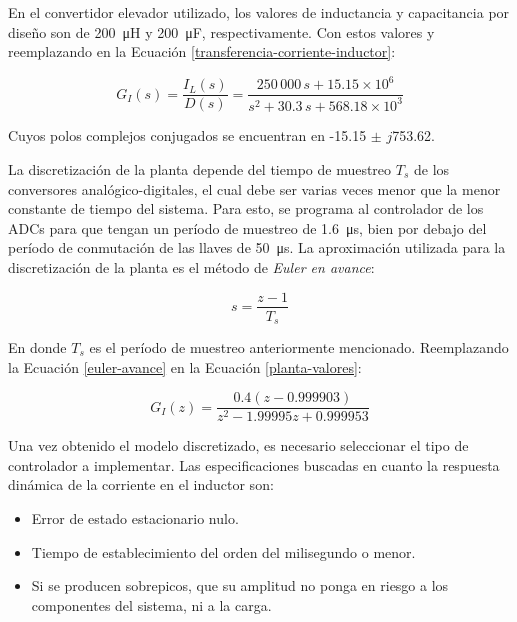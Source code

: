 En el convertidor elevador utilizado, los valores de inductancia y capacitancia por diseño son de \SI{200}{\micro\henry} y \SI{200}{\micro\farad}, respectivamente. Con estos valores y reemplazando en la Ecuación \ref{transferencia-corriente-inductor}:

\begin{equation}
  \boxed{G_I(s) = \frac{I_L(s)}{D(s)} = \frac{250\,000\,s + 15.15 \times 10^6}{s^2 + 30.3 \, s + 568.18 \times 10^3}}
  \label{planta-valores}
\end{equation}

Cuyos polos complejos conjugados se encuentran en -15.15 $\pm$ $j$753.62. 

La discretización de la planta depende del tiempo de muestreo $T_s$ de los conversores analógico-digitales, el cual debe ser varias veces menor que la menor constante de tiempo del sistema. Para esto, se programa al controlador de los ADCs para que tengan un período de muestreo de \SI{1.6}{\micro\second}, bien por debajo del período de conmutación de las llaves de \SI{50}{\micro\second}. La aproximación utilizada para la discretización de la planta es el método de \emph{Euler en avance}:

\begin{equation}
  s = \frac{z-1}{T_s}
  \label{euler-avance}
\end{equation}

En donde $T_s$ es el período de muestreo anteriormente mencionado. Reemplazando la Ecuación \ref{euler-avance} en la Ecuación \ref{planta-valores}:

\begin{equation}
  \boxed{G_I(z) = \frac{0.4(z-0.999903)}{z^2 - 1.99995z  + 0.999953}}
  \label{modelo-discretizado}
\end{equation}

Una vez obtenido el modelo discretizado, es necesario seleccionar el tipo de controlador a implementar. Las especificaciones buscadas en cuanto la respuesta dinámica de la corriente en el inductor son:

\begin{itemize}
  \item Error de estado estacionario nulo.
  \item Tiempo de establecimiento del orden del milisegundo o menor.
  \item Si se producen sobrepicos, que su amplitud no ponga en riesgo a los componentes del sistema, ni a la carga.
\end{itemize}

